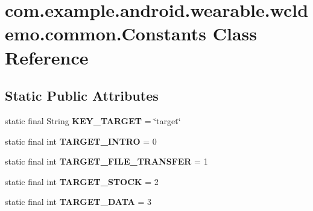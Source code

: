 \hypertarget{classcom_1_1example_1_1android_1_1wearable_1_1wcldemo_1_1common_1_1Constants}{}\section{com.\+example.\+android.\+wearable.\+wcldemo.\+common.\+Constants Class Reference}
\label{classcom_1_1example_1_1android_1_1wearable_1_1wcldemo_1_1common_1_1Constants}
\subsection*{Static Public Attributes}
\begin{DoxyCompactItemize}
\item 
static final String {\bfseries K\+E\+Y\+\_\+\+T\+A\+R\+G\+ET} = \char`\"{}target\char`\"{}\hypertarget{classcom_1_1example_1_1android_1_1wearable_1_1wcldemo_1_1common_1_1Constants_a61de0d69cdcaef6e6d247f89ffa8589e}{}\label{classcom_1_1example_1_1android_1_1wearable_1_1wcldemo_1_1common_1_1Constants_a61de0d69cdcaef6e6d247f89ffa8589e}

\item 
static final int {\bfseries T\+A\+R\+G\+E\+T\+\_\+\+I\+N\+T\+RO} = 0\hypertarget{classcom_1_1example_1_1android_1_1wearable_1_1wcldemo_1_1common_1_1Constants_aaef9b81bba4b19c7d7f3709bece59189}{}\label{classcom_1_1example_1_1android_1_1wearable_1_1wcldemo_1_1common_1_1Constants_aaef9b81bba4b19c7d7f3709bece59189}

\item 
static final int {\bfseries T\+A\+R\+G\+E\+T\+\_\+\+F\+I\+L\+E\+\_\+\+T\+R\+A\+N\+S\+F\+ER} = 1\hypertarget{classcom_1_1example_1_1android_1_1wearable_1_1wcldemo_1_1common_1_1Constants_afead4cf7f3cc4fc177de0d3889b8e118}{}\label{classcom_1_1example_1_1android_1_1wearable_1_1wcldemo_1_1common_1_1Constants_afead4cf7f3cc4fc177de0d3889b8e118}

\item 
static final int {\bfseries T\+A\+R\+G\+E\+T\+\_\+\+S\+T\+O\+CK} = 2\hypertarget{classcom_1_1example_1_1android_1_1wearable_1_1wcldemo_1_1common_1_1Constants_a8dff807e8f8e9d208095a45c9ebf1f6c}{}\label{classcom_1_1example_1_1android_1_1wearable_1_1wcldemo_1_1common_1_1Constants_a8dff807e8f8e9d208095a45c9ebf1f6c}

\item 
static final int {\bfseries T\+A\+R\+G\+E\+T\+\_\+\+D\+A\+TA} = 3\hypertarget{classcom_1_1example_1_1android_1_1wearable_1_1wcldemo_1_1common_1_1Constants_ae086c91e1b8cfa36e11bc7e93f6498a4}{}\label{classcom_1_1example_1_1android_1_1wearable_1_1wcldemo_1_1common_1_1Constants_ae086c91e1b8cfa36e11bc7e93f6498a4}


\end{DoxyCompactItemize}
